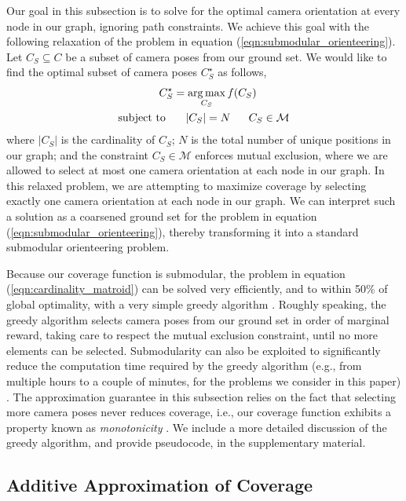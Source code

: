 Our goal in this subsection is to solve for the optimal camera orientation at every node in our graph, ignoring path constraints. 
We achieve this goal with the following relaxation of the problem in equation (\ref{eqn:submodular_orienteering}).
Let $C_S \subseteq C$ be a subset of camera poses from our ground set. We would like to find the optimal subset of camera poses  $C_S^{\star}$ as follows,
%
\begin{equation}
\begin{aligned}
C_S^{\star} = \operatorname*{arg\,max}_{C_S} f(C_S)~~~~~~~~~\\
\text{subject to} ~~~~~ \left\vert C_S \right\vert = N ~~~~~ C_S \in \mathcal{M}
\end{aligned}
\label{eqn:cardinality_matroid}
\end{equation}
%
where
$\left\vert C_S \right\vert$ is the cardinality of $C_S$;
$N$ is the total number of unique positions in our graph;
and the constraint $C_S \in \mathcal{M}$ enforces mutual exclusion, where we are allowed to select at most one camera orientation at each node in our graph.
In this relaxed problem, we are attempting to maximize coverage by selecting exactly one camera orientation at each node in our graph.
We can interpret such a solution as a coarsened ground set for the problem in equation (\ref{eqn:submodular_orienteering}), thereby transforming it into a standard submodular orienteering problem.

Because our coverage function is submodular, the problem in equation (\ref{eqn:cardinality_matroid}) can be solved very efficiently, and to within 50\% of global optimality, with a very simple greedy algorithm \cite{krause:2014}.
Roughly speaking, the greedy algorithm selects camera poses from our ground set in order of marginal reward, taking care to respect the mutual exclusion constraint, until no more elements can be selected.
Submodularity can also be exploited to significantly reduce the computation time required by the greedy algorithm (e.g., from multiple hours to a couple of minutes, for the problems we consider in this paper) \cite{krause:2014}.
The approximation guarantee in this subsection relies on the fact that selecting more camera poses never reduces coverage, i.e., our coverage function exhibits a property known as \emph{monotonicity} \cite{krause:2014}.
We include a more detailed discussion of the greedy algorithm, and provide pseudocode, in the supplementary material.

\subsection{Additive Approximation of Coverage}
\label{sec:trajectories_subgradient}

